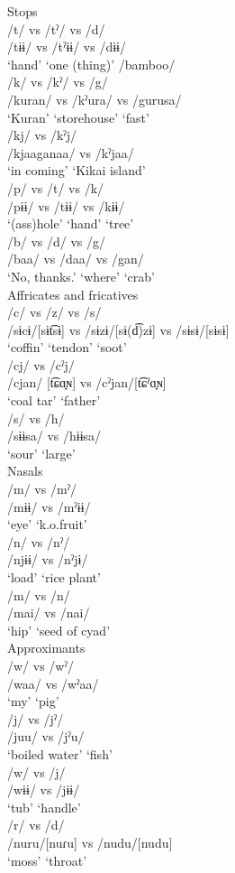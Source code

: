 \ea Stops\\
\ea /t/ vs /tˀ/ vs /d/\\
\gll /tɨɨ/ vs /tˀɨɨ/ vs /dɨɨ/\\
‘hand’ {} ‘one (thing)’ {} /bamboo/\\
\ex /k/ vs /kˀ/ vs /g/\\
\gll /kuran/ vs /kˀura/ vs /gurusa/\\
‘Kuran’ {} ‘storehouse’ {} ‘fast’\\
\ex /kj/ vs /kˀj/\\
\gll /kjaaganaa/ vs /kˀjaa/\\
‘in coming’ {} ‘Kikai island’\\
\ex /p/ vs /t/ vs /k/\\
\gll /pɨɨ/ vs /tɨɨ/ vs /kɨɨ/\\
‘(ass)hole’ {} ‘hand’ {} ‘tree’\\
\ex /b/ vs /d/ vs /g/\\
\gll /baa/ vs /daa/ vs /gan/\\
‘No, thanks.’ {} ‘where’ {} ‘crab’\\
\z
\ex  Affricates and fricatives\\
\ea /c/ vs /z/ vs /s/\\
\gll /sɨcɨ/[sɨt͡sɨ] vs /sɨzɨ/[sɨ(d͡)zɨ] vs /sɨsɨ/[sɨsɨ]\\
‘coffin’ {} ‘tendon’ {} ‘soot’\\
\ex /cj/ vs /cˀj/\\
\gll /cjan/ [t͡ɕɑ̟ɴ] vs /cˀjan/[t͡ɕˀɑ̟ɴ]\\
‘coal tar’ {} ‘father’\\
\ex /s/ vs /h/\\
\gll /sɨɨsa/ vs /hɨɨsa/\\
‘sour’ {} ‘large’\\
\z
\ex  Nasals\\
\ea /m/ vs /mˀ/\\
\gll /mɨɨ/ vs /mˀɨɨ/\\
‘eye’ {}  ‘k.o.fruit’\\
\ex /n/ vs /nˀ/\\
\gll /njɨɨ/ vs /nˀjɨ/\\
‘load’ {}  ‘rice plant’\\
\ex /m/ vs /n/\\
\gll /mai/ vs /nai/\\
‘hip’ {}  ‘seed of cyad’\\
\z
\ex Approximants\\
\ea /w/ vs /wˀ/\\
\gll /waa/ vs /wˀaa/\\
‘my’ {}  ‘pig’\\
\ex /j/ vs /jˀ/\\
\gll /juu/ vs /jˀu/\\
‘boiled water’ {}  ‘fish’\\
\ex /w/ vs /j/\\
\gll /wɨɨ/ vs /jɨɨ/\\
‘tub’ {}  ‘handle’\\
\ex /r/ vs /d/\\
\gll /nuru/[nuɾu] vs /nudu/[nudu]\\
‘moss’ {}  ‘throat’\\
\z
\z

